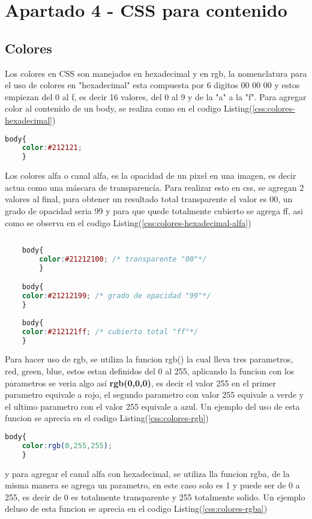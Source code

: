 \section{Apartado 4 - CSS para contenido}

\subsection{Colores}

Los colores en CSS son manejados en hexadecimal y en rgb, la nomenclatura para el uso de
colores en "hexadecimal" esta compuesta por 6 digitos 00 00 00 y estos empiezan del 0 al f,
es decir 16 valores, del 0 al 9 y de la "a" a la "f".
Para agregar color al contenido de un body, se realiza como en el codigo Listing(\ref{css:colores-hexadecimal})
\begin{lstlisting}[caption={Colores en css con hexadecimal},label={css:colores-hexadecimal},language=css]
    body{
    color:#212121;
    }
\end{lstlisting}
Los colores alfa o canal alfa, es la opacidad de un pixel en una imagen, es decir actua
como una máscara de transparencía. Para realizar esto en css, se agregan 2 valores al final,
para obtener un resultado total transparente el valor es 00, un grado de opacidad seria 99 y para que quede 
 totalmente cubierto se agrega ff, asi como se observa en el codigo Listing(\ref{css:colores-hexadecimal-alfa})
 \begin{lstlisting}[caption={Colores en css con hexadecimal},label={css:colores-hexadecimal-alfa},language=css]
    
    body{
        color:#21212100; /* transparente "00"*/
        }

    body{
    color:#21212199; /* grado de opacidad "99"*/
    }
    
    body{
    color:#212121ff; /* cubierto total "ff"*/
    }
\end{lstlisting}
Para hacer uso de rgb, se utiliza la funcion rgb() la cual lleva tres parametros, red, green, blue,
estos estan definidos del 0 al 255, aplicando la funcion con los parametros se veria algo así
\textbf{rgb(0,0,0)}, es decir el valor 255 en el primer parametro equivale a rojo,
el segundo parametro con valor 255 equivale a verde y el ultimo parametro con el valor
255 equivale a azul. Un ejemplo del uso de esta funcion se aprecia en el codigo Listing(\ref{css:colores-rgb})
\begin{lstlisting}[caption={Colores en css con hexadecimal},label={css:colores-rgb},language=css]
    body{
    color:rgb(0,255,255);
    }
\end{lstlisting}
y para agregar el canal alfa con hexadecimal, se utiliza
lla funcion rgba, de la misma manera se agrega un parametro,
en este caso solo es 1 y puede ser de 0 a 255, es decir
de 0 es totalmente transparente y 255 totalmente solido. 
Un ejemplo deluso de esta funcion se aprecia en el codigo Listing(\ref{css:colores-rgba})

